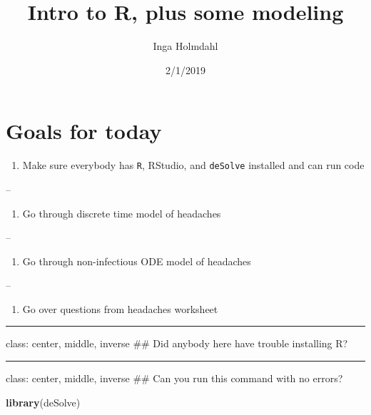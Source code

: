\documentclass[]{article}
\title{Intro to R, plus some modeling}
\author{Inga Holmdahl}
\date{2/1/2019}
\newenvironment{Shaded}{\begin{snugshade}}{\end{snugshade}}
\newcommand{\KeywordTok}[1]{\textcolor[rgb]{0.13,0.29,0.53}{\textbf{#1}}}
\newcommand{\NormalTok}[1]{#1}
\providecommand{\tightlist}{%
  \setlength{\itemsep}{0pt}\setlength{\parskip}{0pt}}
\begin{document}
\maketitle

\section{Goals for today}\label{goals-for-today}

\begin{enumerate}
\def\labelenumi{\arabic{enumi}.}
\tightlist
\item
  Make sure everybody has \texttt{R}, RStudio, and \texttt{deSolve}
  installed and can run code
\end{enumerate}

--

\begin{enumerate}
\def\labelenumi{\arabic{enumi}.}
\setcounter{enumi}{1}
\tightlist
\item
  Go through discrete time model of headaches
\end{enumerate}

--

\begin{enumerate}
\def\labelenumi{\arabic{enumi}.}
\setcounter{enumi}{2}
\tightlist
\item
  Go through non-infectious ODE model of headaches
\end{enumerate}

--

\begin{enumerate}
\def\labelenumi{\arabic{enumi}.}
\setcounter{enumi}{3}
\tightlist
\item
  Go over questions from headaches worksheet
\end{enumerate}

\begin{center}\rule{0.5\linewidth}{\linethickness}\end{center}

class: center, middle, inverse \#\# Did anybody here have trouble
installing R?

\begin{center}\rule{0.5\linewidth}{\linethickness}\end{center}

class: center, middle, inverse \#\# Can you run this command with no
errors?

\begin{Shaded}
\begin{Highlighting}[]
\KeywordTok{library}\NormalTok{(deSolve)}
\end{Highlighting}
\end{Shaded}
\end{document}
